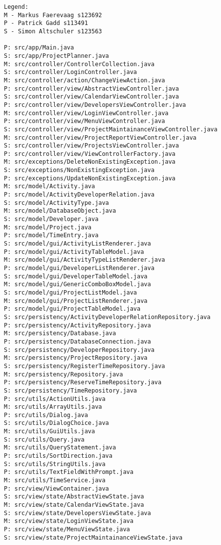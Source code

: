 \begin{verbatim}
Legend:
M - Markus Faerevaag s123692
P - Patrick Gadd s113491
S - Simon Altschuler s123563

P: src/app/Main.java
S: src/app/ProjectPlanner.java
M: src/controller/ControllerCollection.java
S: src/controller/LoginController.java
M: src/controller/action/ChangeViewAction.java
P: src/controller/view/AbstractViewController.java
S: src/controller/view/CalendarViewController.java
P: src/controller/view/DevelopersViewController.java
M: src/controller/view/LoginViewController.java
P: src/controller/view/MenuViewController.java
S: src/controller/view/ProjectMaintainanceViewController.java
M: src/controller/view/ProjectReportViewController.java
S: src/controller/view/ProjectsViewController.java
P: src/controller/view/ViewControllerFactory.java
M: src/exceptions/DeleteNonExistingException.java
S: src/exceptions/NonExistingException.java
P: src/exceptions/UpdateNonExistingException.java
M: src/model/Activity.java
P: src/model/ActivityDeveloperRelation.java
S: src/model/ActivityType.java
M: src/model/DatabaseObject.java
S: src/model/Developer.java
M: src/model/Project.java
P: src/model/TimeEntry.java
S: src/model/gui/ActivityListRenderer.java
P: src/model/gui/ActivityTableModel.java
M: src/model/gui/ActivityTypeListRenderer.java
P: src/model/gui/DeveloperListRenderer.java
S: src/model/gui/DeveloperTableModel.java
M: src/model/gui/GenericComboBoxModel.java
S: src/model/gui/ProjectListModel.java
M: src/model/gui/ProjectListRenderer.java
P: src/model/gui/ProjectTableModel.java
S: src/persistency/ActivityDeveloperRelationRepository.java
P: src/persistency/ActivityRepository.java
M: src/persistency/Database.java
P: src/persistency/DatabaseConnection.java
S: src/persistency/DeveloperRepository.java
M: src/persistency/ProjectRepository.java
S: src/persistency/RegisterTimeRepository.java
M: src/persistency/Repository.java
P: src/persistency/ReserveTimeRepository.java
S: src/persistency/TimeRepository.java
P: src/utils/ActionUtils.java
M: src/utils/ArrayUtils.java
P: src/utils/Dialog.java
S: src/utils/DialogChoice.java
M: src/utils/GuiUtils.java
S: src/utils/Query.java
M: src/utils/QueryStatement.java
P: src/utils/SortDirection.java
S: src/utils/StringUtils.java
P: src/utils/TextFieldWithPrompt.java
M: src/utils/TimeService.java
P: src/view/ViewContainer.java
S: src/view/state/AbstractViewState.java
M: src/view/state/CalendarViewState.java
S: src/view/state/DevelopersViewState.java
M: src/view/state/LoginViewState.java
P: src/view/state/MenuViewState.java
S: src/view/state/ProjectMaintainanceViewState.java

\end{verbatim}
